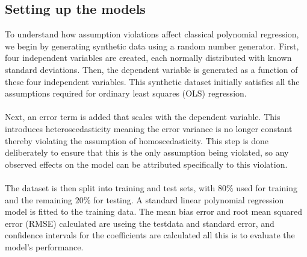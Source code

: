 




\subsection{Setting up the models}
To understand how assumption violations affect classical polynomial regression, we begin by generating synthetic data using a random number generator. First, four independent variables are created, each normally distributed with known standard deviations. Then, the dependent variable is generated as a function of these four independent variables. This synthetic dataset initially satisfies all the assumptions required for ordinary least squares (OLS) regression.
\\\\




\noindent Next, an error term is added that scales with the dependent variable. This introduces heteroscedasticity meaning the error variance is no longer constant thereby violating the assumption of homoscedasticity. This step is done deliberately to ensure that this is the only assumption being violated, so any observed effects on the model can be attributed specifically to this violation.
\\\\

The dataset is then split into training and test sets, with $80\%$ used for training and the remaining $20\%$ for testing. A standard linear polynomial regression model is fitted to the training data. The mean bias error and root mean squared error (RMSE) calculated are useing the testdata and standard error, and confidence intervals for the coefficients are calculated all this is to evaluate the model's performance.
\\\\



